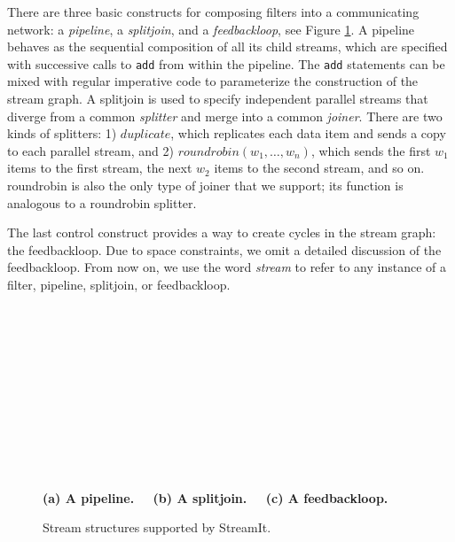 There are three basic constructs for composing filters into a
communicating network: a {\it pipeline}, a {\it splitjoin}, and a {\it
feedbackloop}, see Figure \ref{fig:structures}.  A pipeline behaves as
the sequential composition of all its child streams, which are
specified with successive calls to {\tt add} from within the pipeline.
The {\tt add} statements can be mixed with regular imperative code to
parameterize the construction of the stream graph. A splitjoin is used
to specify independent parallel streams that diverge from a common
{\it splitter} and merge into a common {\it joiner}.  There are two
kinds of splitters: 1) $duplicate$, which replicates each data item
and sends a copy to each parallel stream, and 2) $roundrobin(w_1,
\dots, w_n)$, which sends the first $w_1$ items to the first stream,
the next $w_2$ items to the second stream, and so on. roundrobin is
also the only type of joiner that we support; its function is
analogous to a roundrobin splitter.

The last control construct provides a way to create cycles in the
stream graph: the feedbackloop.  Due to space constraints, we omit a
detailed discussion of the feedbackloop. From now on, we use the word
{\it stream} to refer to any instance of a filter, pipeline,
splitjoin, or feedbackloop.

\begin{figure}[t]
\begin{center}
\begin{minipage}{0.46in}
\centering
{} \\
\end{minipage} 
~
\begin{minipage}{1.3in}
\centering
{} \\
\end{minipage}
~
\begin{minipage}{1.02in}
\centering
{} \\
\end{minipage} 
\\ ~ \\ {\bf \protect\small (a) A pipeline. ~~(b) A splitjoin. ~~(c) A feedbackloop.}
\caption{\protect\small Stream structures supported by StreamIt.
\protect\label{fig:structures}}
\end{center}
\end{figure}

